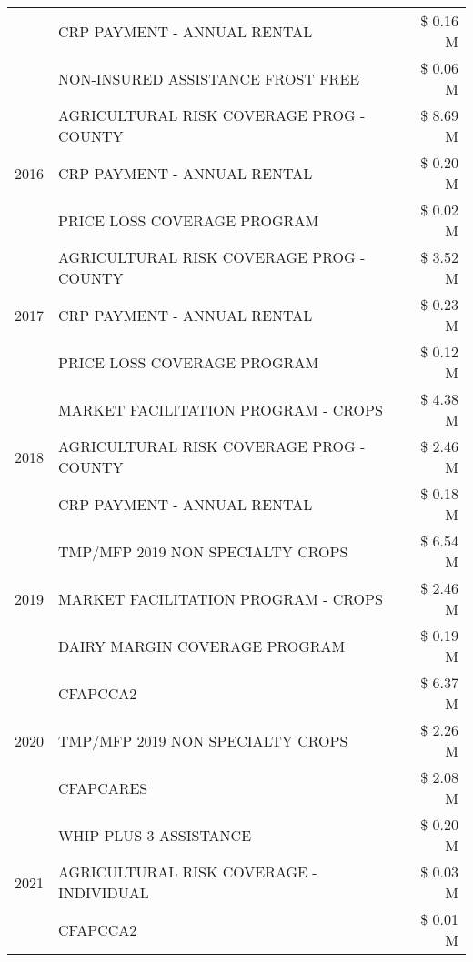 \begin{tabular}{llr}
 & CRP PAYMENT - ANNUAL RENTAL & \$ 0.16 M \\
 & NON-INSURED ASSISTANCE FROST FREE & \$ 0.06 M \\
\cline{1-3}
\multirow[t]{3}{*}{2016} & AGRICULTURAL RISK COVERAGE PROG - COUNTY      & \$ 8.69 M \\
 & CRP PAYMENT - ANNUAL RENTAL                   & \$ 0.20 M \\
 & PRICE LOSS COVERAGE PROGRAM                   & \$ 0.02 M \\
\cline{1-3}
\multirow[t]{3}{*}{2017} & AGRICULTURAL RISK COVERAGE PROG - COUNTY & \$ 3.52 M \\
 & CRP PAYMENT - ANNUAL RENTAL & \$ 0.23 M \\
 & PRICE LOSS COVERAGE PROGRAM & \$ 0.12 M \\
\cline{1-3}
\multirow[t]{3}{*}{2018} & MARKET FACILITATION PROGRAM - CROPS & \$ 4.38 M \\
 & AGRICULTURAL RISK COVERAGE PROG - COUNTY & \$ 2.46 M \\
 & CRP PAYMENT - ANNUAL RENTAL & \$ 0.18 M \\
\cline{1-3}
\multirow[t]{3}{*}{2019} & TMP/MFP 2019 NON SPECIALTY CROPS & \$ 6.54 M \\
 & MARKET FACILITATION PROGRAM - CROPS & \$ 2.46 M \\
 & DAIRY MARGIN COVERAGE PROGRAM & \$ 0.19 M \\
\cline{1-3}
\multirow[t]{3}{*}{2020} & CFAPCCA2 & \$ 6.37 M \\
 & TMP/MFP 2019 NON SPECIALTY CROPS & \$ 2.26 M \\
 & CFAPCARES & \$ 2.08 M \\
\cline{1-3}
\multirow[t]{3}{*}{2021} & WHIP PLUS 3 ASSISTANCE & \$ 0.20 M \\
 & AGRICULTURAL RISK COVERAGE - INDIVIDUAL & \$ 0.03 M \\
 & CFAPCCA2 & \$ 0.01 M \\
\cline{1-3}
\bottomrule
\end{tabular}
